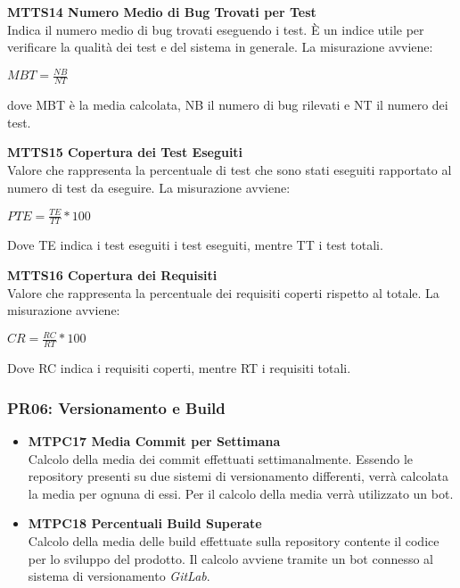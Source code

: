 \begin{itemize}
	\item \textbf{MTTS14 Numero Medio di Bug Trovati per Test}\-\\
Indica il numero medio di bug trovati eseguendo i test. È  un indice utile per verificare la qualità dei test e del sistema in generale. La misurazione avviene:
\begin{center}
	\item $MBT = \frac{NB}{NT}$
\end{center}
dove MBT è la media calcolata, NB il numero di bug rilevati e NT il numero dei test.
	\item \textbf{MTTS15 Copertura dei Test Eseguiti}\-\\
Valore che rappresenta la percentuale di test che sono stati eseguiti rapportato al numero di test da eseguire. La misurazione avviene:
\begin{center}
	\item $PTE = \frac{TE}{TT}*100$
\end{center}
Dove TE indica i test eseguiti i test eseguiti, mentre TT i test totali.
	\item \textbf{MTTS16 Copertura dei Requisiti}\-\\
Valore che rappresenta la percentuale dei requisiti coperti rispetto al totale. La misurazione avviene:
\begin{center}
	\item $CR = \frac{RC}{RT}*100$
\end{center}
Dove RC indica i requisiti coperti, mentre RT i requisiti totali.


\end{itemize}


\subsubsection{PR06: Versionamento e Build}
\begin{itemize}
	\item \textbf{MTPC17 Media Commit per Settimana} ~\\
	Calcolo della media dei commit effettuati settimanalmente. Essendo le repository presenti su due sistemi di versionamento differenti, verrà calcolata la media per ognuna di essi. Per il calcolo della media verrà utilizzato un bot.
	\item \textbf{MTPC18 Percentuali Build Superate} ~\\
	Calcolo della media delle build effettuate sulla repository contente il codice per lo sviluppo del prodotto. Il calcolo avviene tramite un bot connesso al sistema di versionamento \textit{GitLab}. 
\end{itemize}

